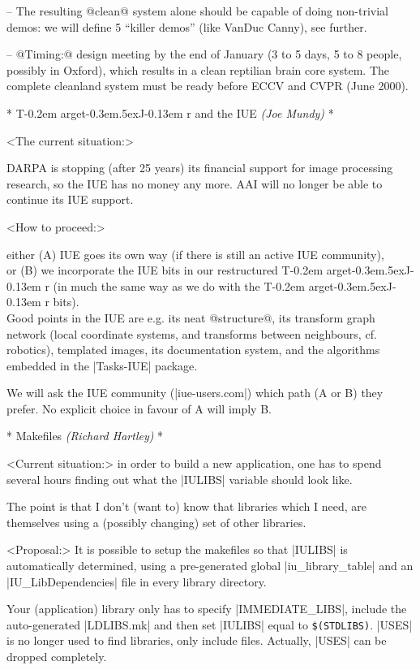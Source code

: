 \documentclass[11pt]{article}
\makeatletter
\def\TargetJr{{T\kern-0.2em arget\kern-0.3em\lower.5ex\hbox{\Large J}\kern-0.13em r}}
\def\by#1.{{\normalsize\sf\it(#1)}}\relax
\edef\@{@}\edef\<{<}\edef\|{|}
\makeatother
\begin{document}
-- The resulting @clean@ system alone should be capable of doing non-trivial
demos:  we will define 5 ``killer demos'' (like VanDuc Canny), see further.

-- @Timing:@ design meeting by the end of January (3 to 5 days, 5 to 8 people,
possibly in Oxford), which results in a clean reptilian brain core system.
The complete cleanland system must be ready before ECCV and CVPR (June 2000).


* \TargetJr{} and the IUE \by Joe Mundy. *

<The current situation:>

DARPA is stopping (after 25 years) its financial support for image processing
research, so the IUE has no money any more.  AAI will no longer be able to
continue its IUE support.

<How to proceed:>

either (A) IUE goes its own way (if there is still an active IUE community), \\
or     (B) we incorporate the IUE bits in our restructured \TargetJr{}
           (in much the same way as we do with the \TargetJr{} bits). \\
Good points in the IUE are e.g. its neat @structure@, its transform graph
network (local coordinate systems, and transforms between neighbours,
cf. robotics), templated images, its documentation system, and the algorithms
embedded in the |Tasks-IUE| package.

We will ask the IUE community (|iue-users\@aai.com|) which path (A or B) they
prefer.  No explicit choice in favour of A will imply B.

* Makefiles \by Richard Hartley. *

<Current situation:>
in order to build a new application, one has to spend several hours
finding out what the |IULIBS| variable should look like.

The point is that I don't (want to) know that libraries which I need, are
themselves using a (possibly changing) set of other libraries.

<Proposal:>
It is possible to setup the makefiles so that |IULIBS| is automatically
determined, using a pre-generated global |iu_library_table| and an
|IU_LibDependencies| file in every library directory.

Your (application) library only has to specify |IMMEDIATE_LIBS|, include
the auto-generated |LDLIBS.mk| and then set |IULIBS| equal to
\verb|$(STDLIBS)|.  %
|USES| is no longer used to find libraries, only include files.
Actually, |USES| can be dropped completely.
\end{document}
